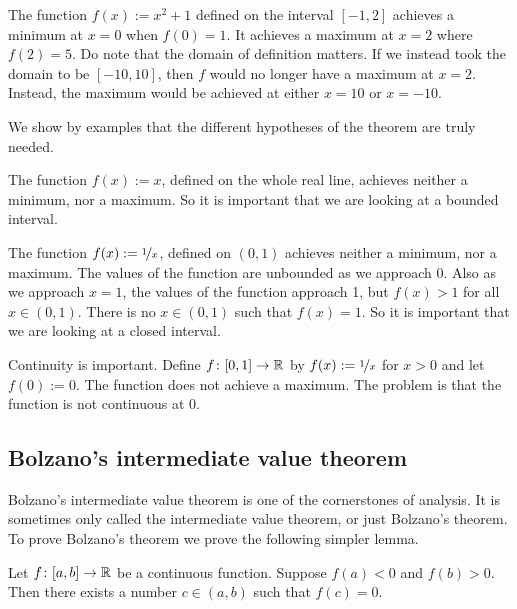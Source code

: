 \begin{example}
The function $f(x) := x^2+1$ defined on the interval $[-1,2]$ achieves a minimum
at $x=0$ when $f(0) = 1$.  It achieves a maximum at $x=2$ where $f(2) = 5$.
Do note that the domain of definition matters.  If we instead took the domain
to be $[-10,10]$, then $f$ would no longer have a maximum at $x=2$.
Instead,
the maximum would be achieved at either $x=10$ or $x=-10$.
\end{example}

We show by examples that the different hypotheses of the theorem are
truly needed.

\begin{example}
The function $f(x) := x$, defined on the whole real line,
achieves neither a minimum, nor a maximum.  So it is important that
we are looking at a bounded interval.
\end{example}

\begin{example}
The function $f(x) := \nicefrac{1}{x}$, defined on $(0,1)$ 
achieves neither a minimum, nor a maximum.  The values of the function are
unbounded as we approach 0.  Also as we approach $x=1$, the values of the
function approach 1, but $f(x) > 1$ for all $x \in (0,1)$.  There is
no $x \in (0,1)$ such that $f(x) = 1$.  So it is important that
we are looking at a closed interval.
\end{example}

\begin{example}
Continuity is important.
Define $f \colon [0,1] \to {\mathbb{R}}$ by 
$f(x) := \nicefrac{1}{x}$ for $x > 0$ and let $f(0) := 0$.
The function does not achieve a maximum.  The problem is that
the function is not continuous at 0.
\end{example}

\subsection{Bolzano's intermediate value theorem}

Bolzano's intermediate value theorem is one of the cornerstones of analysis.
It is sometimes only called the intermediate value theorem, or just
Bolzano's theorem.  To prove Bolzano's theorem we prove the
following simpler lemma.

\begin{lemma} \label{IVT:lemma}
Let $f \colon [a,b] \to {\mathbb{R}}$ be a continuous function.
Suppose $f(a) < 0$ and $f(b) > 0$. 
Then there exists a number $c \in (a,b)$
such that $f(c) = 0$.
\end{lemma}


